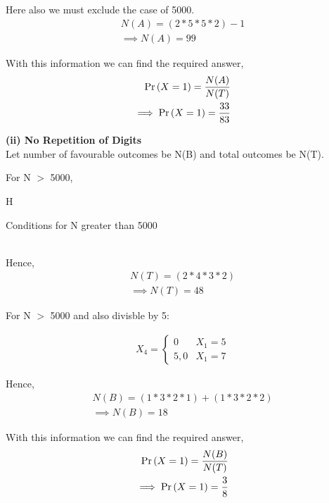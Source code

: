\documentclass{article}
\begin{document}
Here also we must exclude the case of 5000.
\begin{align}
	N(A)=(2*5*5*2)-1 \\
	\implies N(A)=99
\end{align}

With this information we can find the required answer,
\begin{align}
	\Pr\left(X=1\right)=\frac{N(A)}{N(T)}\\
	\implies \Pr\left(X=1\right)=\frac{33}{83}
\end{align}



\textbf{(ii) No Repetition of Digits}\\
Let number of favourable outcomes be N(B) and total outcomes be N(T).

For N $>$ 5000,

H\begin{table}[h]
    \centering
    
    \caption{Conditions for N greater than 5000}
    \label{table_4}
    \end{table}
\\
Hence,
\begin{align}
	N(T)=(2*4*3*2) \\
	\implies N(T)=48
\end{align}

For N $>$ 5000 and also divisble by 5:

\begin{align}
	X_{4} = \begin{cases}
		0 & X_{1}=5 \\
		5,0 & X_{1}=7
	\end{cases}
\end{align}

Hence,
\begin{align}
	N(B)=(1*3*2*1)+(1*3*2*2) \\
	\implies N(B)=18
\end{align}

With this information we can find the required answer,
\begin{align}
	\Pr\left(X=1\right)=\frac{N(B)}{N(T)}\\
	\implies \Pr\left(X=1\right)=\frac{3}{8}
\end{align}
\end{document}
